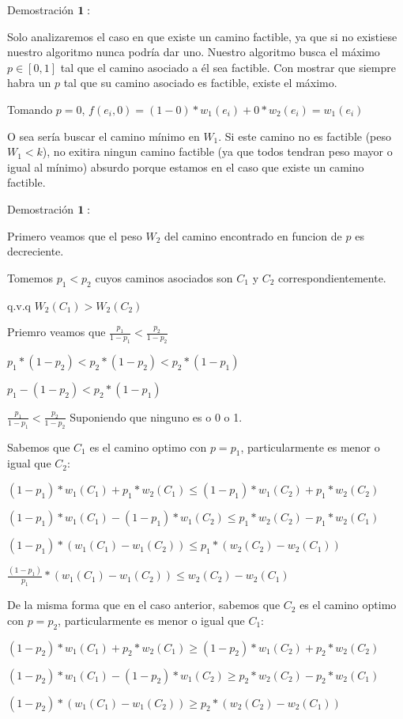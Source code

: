 Demostraci\'on $\bold{1}:$

Solo analizaremos el caso en que existe un camino factible, ya que si no existiese nuestro algoritmo nunca podr\'ia dar uno.
Nuestro algoritmo busca el m\'aximo $p \in [0,1]$ tal que el camino asociado a \'el sea factible. Con mostrar que siempre habra un $p$ tal que su camino asociado es factible, existe el m\'aximo.

Tomando $p=0$, $f(e_i,0) = (1-0)*w_1(e_i) + 0*w_2(e_i) = w_1(e_i)$

O sea ser\'ia buscar el camino m\'inimo en $W_1$. Si este camino no es factible (peso $W_1 < k$), no exitira ningun camino factible (ya que todos tendran peso mayor o igual al m\'inimo) absurdo porque estamos en el caso que existe un camino factible.

Demostraci\'on $\bold{1}:$

Primero veamos que el peso $W_2$ del camino encontrado en funcion de $p$ es decreciente.

Tomemos $p_1 < p_2$ cuyos caminos asociados son $C_1$ y $C_2$ correspondientemente.

q.v.q $W_2(C_1) > W_2(C_2)$

Priemro veamos que $\frac{p_1}{1-p_1} < \frac{p_2}{1-p_2}$

$ p_1* (1-p_2) < p_2 * (1-p_2) < p_2 * (1-p_1)$

$ p_1 - (1-p_2) < p_2 * (1-p_1)$

$ \frac{p_1}{1-p_1} < \frac{p_2}{1-p_2} $ Suponiendo que ninguno es o 0 o 1.


Sabemos que $C_1$ es el camino optimo con $p=p_1$, particularmente es menor o igual que $C_2$:

$(1-p_1)*w_1(C_1) + p_1*w_2(C_1) \leq (1-p_1)*w_1(C_2) + p_1*w_2(C_2) $

$(1-p_1)*w_1(C_1) - (1-p_1)*w_1(C_2) \leq  p_1*w_2(C_2) - p_1*w_2(C_1) $

$(1-p_1)*(w_1(C_1) - w_1(C_2)) \leq  p_1*(w_2(C_2) - w_2(C_1)) $

$\frac{(1-p_1)}{p_1}*(w_1(C_1) - w_1(C_2)) \leq  w_2(C_2) - w_2(C_1) $

De la misma forma que en el caso anterior, sabemos que $C_2$ es el camino optimo con $p=p_2$, particularmente es menor o igual que $C_1$:

$(1-p_2)*w_1(C_1) + p_2*w_2(C_1) \geq (1-p_2)*w_1(C_2) + p_2*w_2(C_2) $

$(1-p_2)*w_1(C_1) - (1-p_2)*w_1(C_2) \geq  p_2*w_2(C_2) - p_2*w_2(C_1) $

$(1-p_2)*(w_1(C_1) - w_1(C_2)) \geq  p_2*(w_2(C_2) - w_2(C_1)) $

